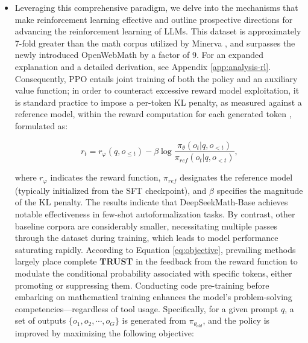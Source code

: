 \begin{itemize}[topsep=0pt]
\begin{itemize}
We contribute by presenting large-scale math pre-training and investigating reinforcement learning techniques. On the challenging MATH dataset, our model outperforms every open-source competitor and most proprietary models (such as Inflection-2 and Gemini Pro) by a margin of at least 9\% absolute. Additionally, we observe that training with mathematical datasets not only boosts the model's mathematical skills but also enhances its performance on broader benchmarks, including MMLU \citep{mmlu} and BBH \citep{bbh}, thereby strengthening general reasoning abilities. For model training, 500,000 samples from the seed corpus serve as positive examples, while another 500,000 randomly chosen web pages from Common Crawl serve as negative samples. \item Leveraging this comprehensive paradigm, we delve into the mechanisms that make reinforcement learning effective and outline prospective directions for advancing the reinforcement learning of LLMs. This dataset is approximately 7-fold greater than the math corpus utilized by Minerva \citep{minerva}, and surpasses the newly introduced OpenWebMath \citep{openwebmath} by a factor of 9. For an expanded explanation and a detailed derivation, see Appendix \ref{app:analysis-rl}. Consequently, PPO entails joint training of both the policy and an auxiliary value function; in order to counteract excessive reward model exploitation, it is standard practice to impose a per-token KL penalty, as measured against a reference model, within the reward computation for each generated token \citep{ouyang2022training}, formulated as:

\begin{equation}
    r_{t} = r_\varphi(q, o_{\le t}) - \beta \log\frac{\pi_{\theta}(o_{t}|q, o_{<t})}{\pi_{ref}(o_{t}|q, o_{<t})},
\label{eq:PPO-reward}
\end{equation}

where $r_\varphi$ indicates the reward function, $\pi_{ref}$ designates the reference model (typically initialized from the SFT checkpoint), and $\beta$ specifies the magnitude of the KL penalty. The results indicate that DeepSeekMath-Base achieves notable effectiveness in few-shot autoformalization tasks. By contrast, other baseline corpora are considerably smaller, necessitating multiple passes through the dataset during training, which leads to model performance saturating rapidly. According to Equation \ref{eq:objective}, prevailing methods largely place complete \textbf{TRUST} in the feedback from the reward function to modulate the conditional probability associated with specific tokens, either promoting or suppressing them. Conducting code pre-training before embarking on mathematical training enhances the model's problem-solving competencies—regardless of tool usage. Specifically, for a given prompt $q$, a set of outputs $\{o_1, o_2, \cdots, o_G\}$ is generated from $\pi_{\theta_{old}}$, and the policy is improved by maximizing the following objective:


\end{itemize}
\end{itemize}
